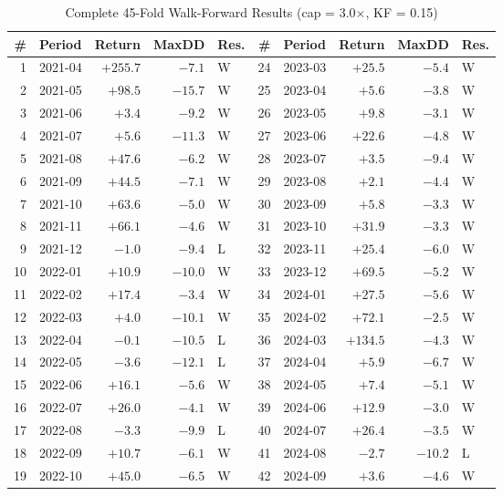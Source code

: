 \documentclass[12pt,a4paper]{article}
\begin{document}
\begin{table}[htbp]
\centering
\caption{Complete 45-Fold Walk-Forward Results (cap = 3.0$\times$, KF = 0.15)}
\label{tab:all_folds}
\small
\begin{tabular}{rlrrl|rlrrl}
\toprule
\# & Period & Return & MaxDD & Res. & \# & Period & Return & MaxDD & Res. \\
\midrule
1  & 2021-04 & $+255.7$ & $-7.1$ & W & 24 & 2023-03 & $+25.5$ & $-5.4$ & W \\
2  & 2021-05 & $+98.5$  & $-15.7$ & W & 25 & 2023-04 & $+5.6$  & $-3.8$ & W \\
3  & 2021-06 & $+3.4$   & $-9.2$ & W & 26 & 2023-05 & $+9.8$  & $-3.1$ & W \\
4  & 2021-07 & $+5.6$   & $-11.3$ & W & 27 & 2023-06 & $+22.6$ & $-4.8$ & W \\
5  & 2021-08 & $+47.6$  & $-6.2$ & W & 28 & 2023-07 & $+3.5$  & $-9.4$ & W \\
6  & 2021-09 & $+44.5$  & $-7.1$ & W & 29 & 2023-08 & $+2.1$  & $-4.4$ & W \\
7  & 2021-10 & $+63.6$  & $-5.0$ & W & 30 & 2023-09 & $+5.8$  & $-3.3$ & W \\
8  & 2021-11 & $+66.1$  & $-4.6$ & W & 31 & 2023-10 & $+31.9$ & $-3.3$ & W \\
9  & 2021-12 & $-1.0$   & $-9.4$ & L & 32 & 2023-11 & $+25.4$ & $-6.0$ & W \\
10 & 2022-01 & $+10.9$  & $-10.0$ & W & 33 & 2023-12 & $+69.5$ & $-5.2$ & W \\
11 & 2022-02 & $+17.4$  & $-3.4$ & W & 34 & 2024-01 & $+27.5$ & $-5.6$ & W \\
12 & 2022-03 & $+4.0$   & $-10.1$ & W & 35 & 2024-02 & $+72.1$ & $-2.5$ & W \\
13 & 2022-04 & $-0.1$   & $-10.5$ & L & 36 & 2024-03 & $+134.5$ & $-4.3$ & W \\
14 & 2022-05 & $-3.6$   & $-12.1$ & L & 37 & 2024-04 & $+5.9$  & $-6.7$ & W \\
15 & 2022-06 & $+16.1$  & $-5.6$ & W & 38 & 2024-05 & $+7.4$  & $-5.1$ & W \\
16 & 2022-07 & $+26.0$  & $-4.1$ & W & 39 & 2024-06 & $+12.9$ & $-3.0$ & W \\
17 & 2022-08 & $-3.3$   & $-9.9$ & L & 40 & 2024-07 & $+26.4$ & $-3.5$ & W \\
18 & 2022-09 & $+10.7$  & $-6.1$ & W & 41 & 2024-08 & $-2.7$  & $-10.2$ & L \\
19 & 2022-10 & $+45.0$  & $-6.5$ & W & 42 & 2024-09 & $+3.6$  & $-4.6$ & W \\

\end{tabular}
\end{table}
\end{document}
